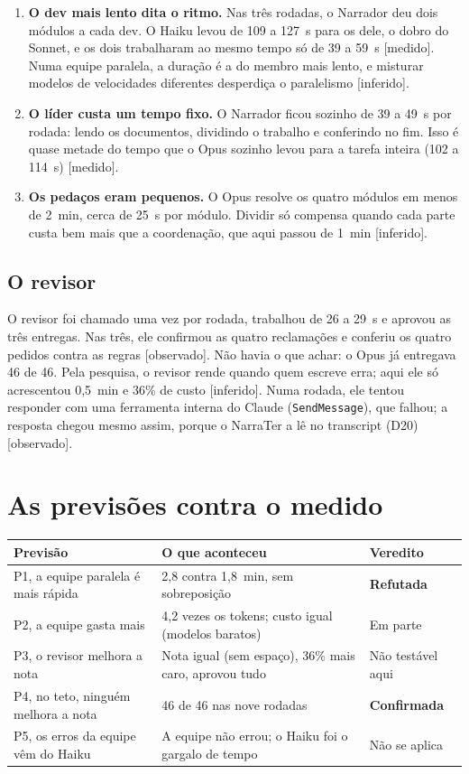 \documentclass[11pt,a4paper]{article}
\newcommand{\rot}[1]{\textsf{\footnotesize[#1]}}
\begin{document}
\begin{enumerate}
  \item \textbf{O dev mais lento dita o ritmo.} Nas três rodadas, o Narrador deu dois módulos a cada dev.
    O Haiku levou de 109 a 127~s para os dele, o dobro do Sonnet, e os dois trabalharam ao mesmo tempo só
    de 39 a 59~s \rot{medido}. Numa equipe paralela, a duração é a do membro mais lento, e misturar modelos
    de velocidades diferentes desperdiça o paralelismo \rot{inferido}.
  \item \textbf{O líder custa um tempo fixo.} O Narrador ficou sozinho de 39 a 49~s por rodada: lendo os
    documentos, dividindo o trabalho e conferindo no fim. Isso é quase metade do tempo que o Opus sozinho
    levou para a tarefa inteira (102 a 114~s) \rot{medido}.
  \item \textbf{Os pedaços eram pequenos.} O Opus resolve os quatro módulos em menos de 2~min, cerca de
    25~s por módulo. Dividir só compensa quando cada parte custa bem mais que a coordenação, que aqui
    passou de 1~min \rot{inferido}.
\end{enumerate}

\subsection{O revisor}

O revisor foi chamado uma vez por rodada, trabalhou de 26 a 29~s e aprovou as três entregas. Nas três,
ele confirmou as quatro reclamações e conferiu os quatro pedidos contra as regras \rot{observado}. Não
havia o que achar: o Opus já entregava 46 de 46. Pela pesquisa, o revisor rende quando quem escreve
erra; aqui ele só acrescentou 0,5~min e 36\% de custo \rot{inferido}. Numa rodada, ele tentou responder
com uma ferramenta interna do Claude (\texttt{SendMessage}), que falhou; a resposta chegou mesmo assim,
porque o NarraTer a lê no transcript (D20) \rot{observado}.

\section{As previsões contra o medido}

\begin{table}[H]
\centering\small
\begin{tabularx}{\linewidth}{lYl}
\toprule
Previsão & O que aconteceu & Veredito \\
\midrule
P1, a equipe paralela é mais rápida & 2,8 contra 1,8~min, sem sobreposição & \textbf{Refutada} \\
P2, a equipe gasta mais & 4,2 vezes os tokens; custo igual (modelos baratos) & Em parte \\
P3, o revisor melhora a nota & Nota igual (sem espaço), 36\% mais caro, aprovou tudo & Não testável aqui \\
P4, no teto, ninguém melhora a nota & 46 de 46 nas nove rodadas & \textbf{Confirmada} \\
P5, os erros da equipe vêm do Haiku & A equipe não errou; o Haiku foi o gargalo de tempo & Não se aplica \\
\bottomrule
\end{tabularx}
\end{table}
\end{document}
